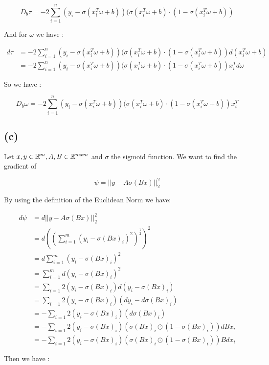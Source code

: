  \[
 D_b \tau =   -2\sum_{i=1}^n(y_i-\sigma(x_i^T\omega +b))(\sigma(x_i^T\omega +b)\cdot(1-\sigma(x_i^T\omega +b))  
 \]

 And for $\omega$ we have :

\begin{align*}
    d\tau       &=-2\sum_{i=1}^n(y_i-\sigma(x_i^T\omega +b))(\sigma(x_i^T\omega +b)\cdot(1-\sigma(x_i^T\omega +b))d(x_i^T\omega +b)  \\
                &=-2\sum_{i=1}^n(y_i-\sigma(x_i^T\omega +b))(\sigma(x_i^T\omega +b)\cdot(1-\sigma(x_i^T\omega +b))x_i^T d\omega
\end{align*}

So we have :

\[
    D_b \omega =    -2\sum_{i=1}^n(y_i-\sigma(x_i^T\omega +b))(\sigma(x_i^T\omega +b)\cdot(1-\sigma(x_i^T\omega +b))x_i^T 
\]





\subsection*{(c)}
Let $x,y \in \mathbb{R}^m, A,B \in \mathbb{R}^{mxm}$ and $\sigma$ the sigmoid function. We want to find the gradient of 

\[
\psi  = ||y-A\sigma(Bx)||_2^2    
\]

By using the definition of the Euclidean Norm we have:

\begin{align*}
    d\psi   &=  d||y-A\sigma(Bx)||_2^2\\
            &= d((\sum_{i=1}^m (y_i -\sigma(Bx)_i)^2)^{\frac{1}{2}})^2\\
            &=  d\sum_{i=1}^m (y_i -\sigma(Bx)_i)^2\\
            &=  \sum_{i=1}^m d(y_i -\sigma(Bx)_i)^2 \\
            &=   \sum_{i=1} 2(y_i -\sigma(Bx)_i)d(y_i -\sigma(Bx)_i)\\
            &=   \sum_{i=1} 2(y_i -\sigma(Bx)_i)(dy_i -d\sigma(Bx)_i)\\
            &=   -\sum_{i=1} 2(y_i -\sigma(Bx)_i)(d\sigma(Bx)_i)\\
            &=   -\sum_{i=1} 2(y_i -\sigma(Bx)_i)(\sigma(Bx)_i\odot(1-\sigma(Bx)_i))dBx_i \\
            &=   -\sum_{i=1} 2(y_i -\sigma(Bx)_i)(\sigma(Bx)_i\odot(1-\sigma(Bx)_i))Bdx_i 
\end{align*}

Then we have : 

